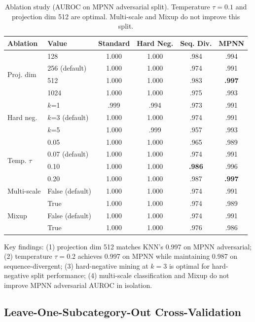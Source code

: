 \documentclass[11pt,a4paper]{article}
\begin{document}
\begin{table}[H]
\centering
\caption{Ablation study (AUROC on MPNN adversarial split). Temperature $\tau=0.1$ and projection dim 512 are optimal. Multi-scale and Mixup do not improve this split.}
\label{tab:ablation}
\small
\begin{tabular}{@{}llcccc@{}}
\toprule
\textbf{Ablation} & \textbf{Value} & \textbf{Standard} & \textbf{Hard Neg.} & \textbf{Seq. Div.} & \textbf{MPNN} \\
\midrule
\multirow{4}{*}{Proj. dim} & 128 & 1.000 & 1.000 & .984 & .994 \\
& 256 (default) & 1.000 & 1.000 & .974 & .991 \\
& 512 & 1.000 & 1.000 & .983 & \textbf{.997} \\
& 1024 & 1.000 & 1.000 & .975 & .993 \\
\midrule
\multirow{3}{*}{Hard neg.} & $k$=1 & .999 & .994 & .973 & .991 \\
& $k$=3 (default) & 1.000 & 1.000 & .974 & .991 \\
& $k$=5 & 1.000 & .999 & .957 & .993 \\
\midrule
\multirow{4}{*}{Temp. $\tau$} & 0.05 & 1.000 & 1.000 & .965 & .989 \\
& 0.07 (default) & 1.000 & 1.000 & .974 & .991 \\
& 0.10 & 1.000 & 1.000 & \textbf{.986} & .996 \\
& 0.20 & 1.000 & 1.000 & .987 & \textbf{.997} \\
\midrule
Multi-scale & False (default) & 1.000 & 1.000 & .974 & .991 \\
& True & 1.000 & 1.000 & .974 & .989 \\
\midrule
Mixup & False (default) & 1.000 & 1.000 & .974 & .991 \\
& True & 1.000 & 1.000 & .976 & .986 \\
\bottomrule
\end{tabular}
\end{table}

Key findings: (1) projection dim 512 matches KNN's 0.997 on MPNN adversarial; (2) temperature $\tau=0.2$ achieves 0.997 on MPNN while maintaining 0.987 on sequence-divergent; (3) hard-negative mining at $k=3$ is optimal for hard-negative split performance; (4) multi-scale classification and Mixup do not improve MPNN adversarial AUROC in isolation.

\subsection{Leave-One-Subcategory-Out Cross-Validation}
\end{document}
